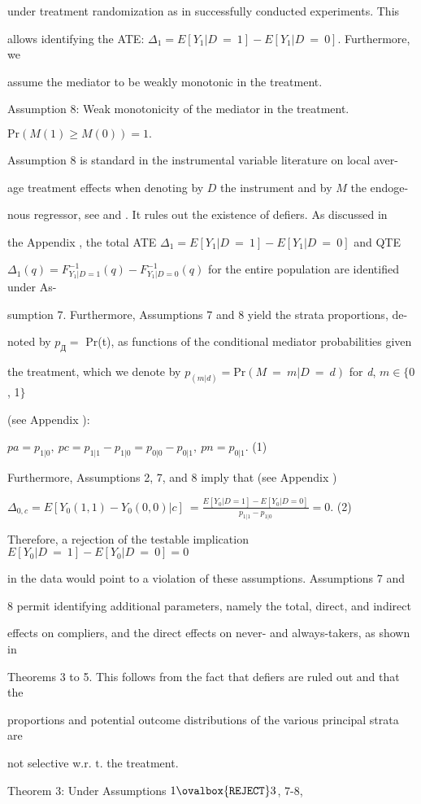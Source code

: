 \documentclass[a4paper,12pt]{article}
\begin{document}
under treatment randomization as in successfully conducted experiments. This

allows identifying the ATE: $\Delta_{1} = E[Y_{1}|D\ =\ 1] -E[Y_{1}|D\ =\ 0]$. Furthermore, we

assume the mediator to be weakly monotonic in the treatment.

Assumption 8: Weak monotonicity of the mediator in the treatment.

$\mathrm{P}\mathrm{r}(M(1)\geq M(0))=1.$

Assumption 8 is standard in the instrumental variable literature on local aver-

age treatment effects when denoting by $D$ the instrument and by $M$ the endoge-

nous regressor, see and . It rules out the existence of defiers. As discussed in

the Appendix , the total ATE $\Delta_{1} = E[Y_{1}|D\ =\ 1] - E[Y_{1}|D\ =\ 0]$ and QTE

$\Delta_{1}(q) =F_{Y_{1}|D=1}^{-1}(q)-F_{Y_{1}|D=0}^{-1}(q)$ for the entire population are identified under As-

sumption 7. Furthermore, Assumptions 7 and 8 yield the strata proportions, de-

noted by $p_{Д} =$ Pr(t), as functions of the conditional mediator probabilities given

the treatment, which we denote by $p_{(m|d)} = \mathrm{P}\mathrm{r} (M\ =\ m|D\ =\ d)$ for {\it d}, $m \in \{0$, 1$\}$

(see Appendix ):
\begin{center}
$pa=p_{1|0},\ pc=p_{1|1}-p_{1|0}=p_{0|0}-p_{0|1},\ pn=p_{0|1}$.   (1)
\end{center}
Furthermore, Assumptions 2, 7, and 8 imply that (see Appendix )
\begin{center}
$\displaystyle \Delta_{0,c}=E[Y_{0}(1,1)-Y_{0}(0,0)|c]\ =\frac{E[Y_{0}|D=1]-E[Y_{0}|D=0]}{p_{1|1}-p_{1|0}}=0$.   (2)
\end{center}
Therefore, a rejection of the testable implication $E[Y_{0}|D\ =\ 1]-E[Y_{0}|D\ =\ 0] = 0$

in the data would point to a violation of these assumptions. Assumptions 7 and

8 permit identifying additional parameters, namely the total, direct, and indirect

effects on compliers, and the direct effects on never- and always-takers, as shown in

Theorems 3 to 5. This follows from the fact that defiers are ruled out and that the

proportions and potential outcome distributions of the various principal strata are

not selective w.r. $\mathrm{t}$. the treatment.

Theorem 3: Under Assumptions $1\ovalbox{\tt\small REJECT} 3$, 7-8,
\end{document}
